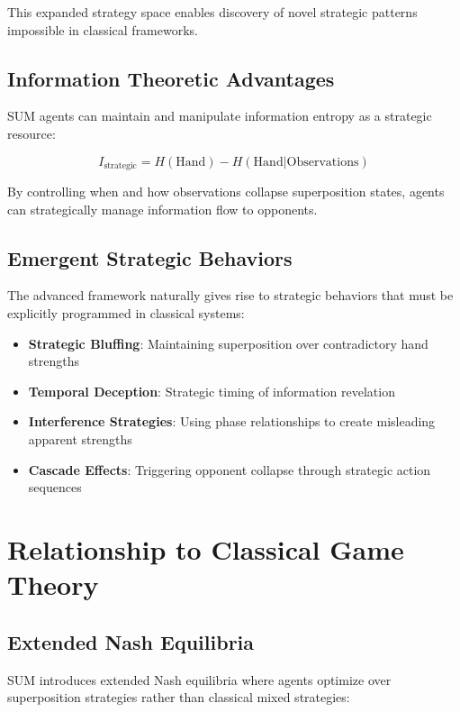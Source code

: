 \documentclass[11pt,a4paper]{article}
\begin{document}
This expanded strategy space enables discovery of novel strategic patterns impossible in classical frameworks.

\subsection{Information Theoretic Advantages}

SUM agents can maintain and manipulate information entropy as a strategic resource:

\begin{equation}
I_{\text{strategic}} = H(\text{Hand}) - H(\text{Hand}|\text{Observations})
\end{equation}

By controlling when and how observations collapse superposition states, agents can strategically manage information flow to opponents.

\subsection{Emergent Strategic Behaviors}

The advanced framework naturally gives rise to strategic behaviors that must be explicitly programmed in classical systems:

\begin{itemize}
\item \textbf{Strategic Bluffing}: Maintaining superposition over contradictory hand strengths
\item \textbf{Temporal Deception}: Strategic timing of information revelation
\item \textbf{Interference Strategies}: Using phase relationships to create misleading apparent strengths
\item \textbf{Cascade Effects}: Triggering opponent collapse through strategic action sequences
\end{itemize}

\section{Relationship to Classical Game Theory}

\subsection{Extended Nash Equilibria}

SUM introduces extended Nash equilibria where agents optimize over superposition strategies rather than classical mixed strategies:
\end{document}
